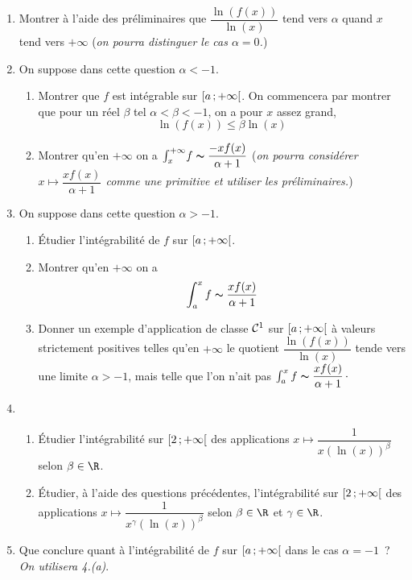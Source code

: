 \documentclass[twoside,french,11pt]{VcCours}
\newcommand{\intervalle}[4]{\mathopen{}\mathclose\bgroup\left#1#2\mathclose{}\mathpunct{};#3\aftergroup\egroup\right#4}
\newcommand{\intfo}[2]{\intervalle{[}{#1}{#2}{[}}
\begin{document}
\medskip

\begin{enumerate}
\item Montrer \`a l'aide des préliminaires que $\dfrac{\ln(f(x))}{\ln(x)}$
tend vers $\alpha$ quand $x$ tend vers $+\infty$ ({\it on pourra distinguer le cas $\alpha=0$.})\medbreak

\item On suppose dans cette question  $\alpha<-1$.
\begin{enumerate}
\item Montrer que $f$ est intégrable sur $\intfo{a}{+\infty}$. On commencera par montrer que pour un réel $\beta$ tel $\alpha < \beta <-1$, on a pour $x$ assez grand,
$$\ln(f(x)) \leq  \beta \ln(x)$$

\smallbreak

\item Montrer qu'en $+\infty$ on a $\int_x^{+\infty}\!f\thicksim \dfrac{-xf(x)}{\alpha+1}$ ({\it on pourra  considérer $x \mapsto \dfrac{xf(x)}{\alpha +1}$ comme une primitive et utiliser les préliminaires.})\medbreak
\end{enumerate}

\item  On suppose dans cette question  $\alpha>-1$.
\begin{enumerate}

\item Étudier l'intégrabilité de $f$ sur $\intfo{a}{+\infty}$.\smallbreak

\item Montrer qu'en $+\infty$ on a
\[
\int_a^xf\thicksim \frac{xf(x)}{\alpha +1}
\]

\item Donner un exemple d'application de classe ${\cal C}^1$ sur
$\intfo{a}{+\infty}$ \`a valeurs strictement positives telles qu'en $+\infty$ le
quotient $\dfrac{\ln(f(x))}{\ln(x)}$ tende vers une limite $\alpha>-1$, mais
telle que l'on n'ait pas $\int_a^xf\thicksim \dfrac{xf(x)}{\alpha +1}\,\cdot$\smallbreak
\end{enumerate}
\item ~
\begin{enumerate}
\item  Étudier l'intégrabilité sur $\intfo{2}{+\infty}$ des applications $x\mapsto
\dfrac{1}{x(\ln(x))^\beta}$ selon $\beta\in \R$.\smallbreak

\item Étudier, \`a l'aide des questions précédentes, l'intégrabilité sur
$\intfo{2}{+\infty}$ des applications $x\mapsto \dfrac{1}{x^\gamma(\ln(x))^\beta}$
selon $\beta\in \R$ et $\gamma\in \R$.\medbreak
\end{enumerate}
\item  Que conclure quant \`a l'intégrabilité de $f$ sur $\intfo{a}{+\infty}$ dans le
cas $\alpha=-1$~? \textit{On utilisera 4.(a)}.
\end{enumerate}\bigbreak
\end{document}
